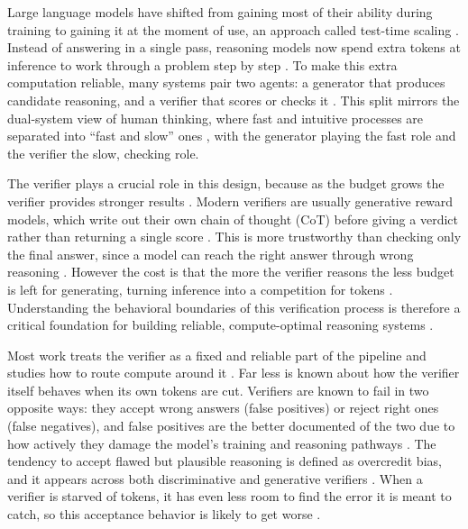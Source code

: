 \documentclass[12pt, a4paper, oneside]{report}
\begin{document}
Large language models have shifted from gaining most of their ability during training to gaining it at the moment of use, an approach called test-time scaling \parencite{Snell2024, Zhang2025tts, Wan2026}. Instead of answering in a single pass, reasoning models now spend extra tokens at inference to work through a problem step by step \parencite{Hu2026, Zhou2026}. To make this extra computation reliable, many systems pair two agents: a generator that produces candidate reasoning, and a verifier that scores or checks it \parencite{Singhi2025, Zhang2025tts}. This split mirrors the dual-system view of human thinking, where fast and intuitive processes are separated into “fast and slow” ones \parencite{Kahneman2014}, with the generator playing the fast role and the verifier the slow, checking role.

The verifier plays a crucial role in this design, because as the budget grows the verifier provides stronger results \parencite{Venktesh2025, Singhi2025}. Modern verifiers are usually generative reward models, which write out their own chain of thought (CoT) before giving a verdict rather than returning a single score \parencite{Singhi2025, Zhang2025tts, Khalifa2025}. This is more trustworthy than checking only the final answer, since a model can reach the right answer through wrong reasoning \parencite{Khalifa2025}. However the cost is that the more the verifier reasons the less budget is left for generating, turning inference into a competition for tokens \parencite{Singhi2025, Chen2025}. Understanding the behavioral boundaries of this verification process is therefore a critical foundation for building reliable, compute-optimal reasoning systems \parencite{Snell2024}.

Most work treats the verifier as a fixed and reliable part of the pipeline and studies how to route compute around it \parencite{Singhi2025, Chen2025}. Far less is known about how the verifier itself behaves when its own tokens are cut. Verifiers are known to fail in two opposite ways: they accept wrong answers (false positives) or reject right ones (false negatives), and false positives are the better documented of the two due to how actively they damage the model's training and reasoning pathways \parencite{Cai2026, Xu2025}. The tendency to accept flawed but plausible reasoning is defined as overcredit bias, and it appears across both discriminative and generative verifiers \parencite{Agrawal2026, Khalifa2025}. When a verifier is starved of tokens, it has even less room to find the error it is meant to catch, so this acceptance behavior is likely to get worse \parencite{Hu2026}.
\end{document}
